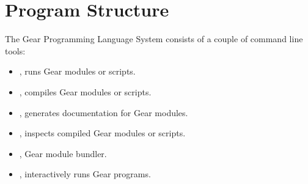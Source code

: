 
\chapter{Program Structure}
\label{sec:program-structure}

The Gear Programming Language System consists of a couple of command line tools: 
\begin{itemize}
  \item {}, runs Gear modules or scripts.
  \item {}, compiles Gear modules or scripts.
  \item {}, generates documentation for Gear modules. 
  \item {}, inspects compiled Gear modules or scripts.
  \item {}, Gear module bundler.
  \item {}, interactively runs Gear programs. 
\end{itemize}

